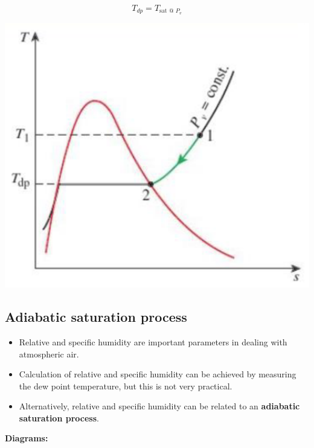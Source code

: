 \documentclass[11pt]{article}
\begin{document}
\[T_{dp} = T_{\text{sat @ } P_v}\]

\begin{center}
\includegraphics[width=.9\linewidth]{./images/dew-point-temperature-t-s-diagram.png}
\end{center}

 \newpage

\subsection{Adiabatic saturation process}
\label{sec:org819ebe4}
\begin{itemize}
\item Relative and specific humidity are important parameters in dealing with atmospheric air.
\item Calculation of relative and specific humidity can be achieved by measuring the dew point temperature, but this is not very practical.
\item Alternatively, relative and specific humidity can be related to an \textbf{adiabatic saturation process}.
\end{itemize}

\textbf{Diagrams:}
\end{document}
